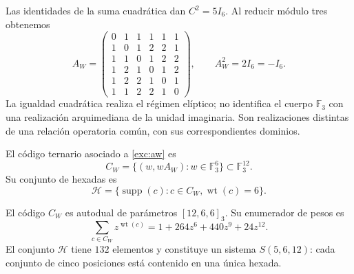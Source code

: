 

Las identidades de la suma cuadrática dan $C^2=5I_6$. Al reducir módulo
tres obtenemos
\begin{equation}
 A_W=
 \begin{pmatrix}
 0&1&1&1&1&1\\
 1&0&1&2&2&1\\
 1&1&0&1&2&2\\
 1&2&1&0&1&2\\
 1&2&2&1&0&1\\
 1&1&2&2&1&0
 \end{pmatrix},
 \qquad A_W^2=2I_6=-I_6.
 \label{exc:aw}
\end{equation}
La igualdad cuadrática realiza el régimen elíptico; no identifica el
cuerpo $\mathbb F_3$ con una realización arquimediana de la unidad
imaginaria. Son realizaciones distintas de una relación operatoria
común, con sus correspondientes dominios.



\begin{definition}
\label{exc:codigo}
El código ternario asociado a \eqref{exc:aw} es
\[
 C_W=\{(w,wA_W):w\in\mathbb F_3^6\}
       \subset\mathbb F_3^{12}.
\]
Su conjunto de hexadas es
\[
 \mathcal H=
 \{\operatorname{supp}(c):c\in C_W,
                           \operatorname{wt}(c)=6\}.
\]
\end{definition}

\begin{proposition}
\label{exc:codigo-witt}
El código $C_W$ es autodual de parámetros $[12,6,6]_3$. Su enumerador
de pesos es
\begin{equation}
 \sum_{c\in C_W}z^{\operatorname{wt}(c)}
   =1+264z^6+440z^9+24z^{12}.
 \label{exc:enumerador}
\end{equation}
El conjunto $\mathcal H$ tiene $132$ elementos y constituye un sistema
$S(5,6,12)$: cada conjunto de cinco posiciones está contenido en una
única hexada.
\end{proposition}

